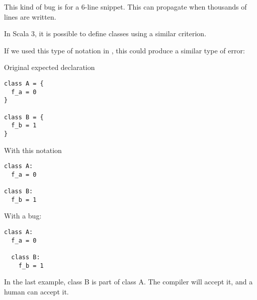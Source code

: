 This kind of bug is for a 6-line snippet.
This can propagate when thousands of lines are written.

In Scala 3, it is possible to define classes using a similar criterion.

If we used this type of notation in \Soda, this could produce a similar type of error:

Original expected declaration

\begin{lstlisting}[label={lst:classesWithBraces}]
class A = {
  f_a = 0
}

class B = {
  f_b = 1
}
\end{lstlisting}

With this notation
\begin{lstlisting}[label={lst:classesWithColons}]
class A:
  f_a = 0

class B:
  f_b = 1
\end{lstlisting}

With a bug:
\begin{lstlisting}[label={lst:classesWithColonsAndMistake}]
class A:
  f_a = 0

  class B:
    f_b = 1
\end{lstlisting}

In the last example, class B is part of class A.
The compiler will accept it, and a human can accept it.


